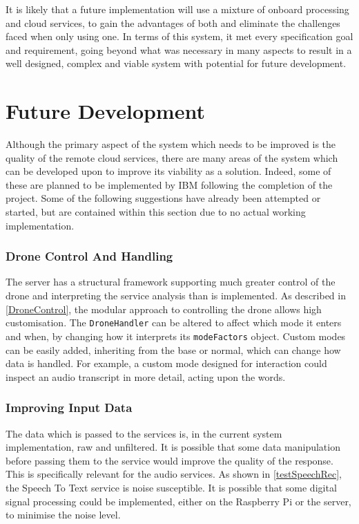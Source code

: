 \documentclass{article}
\begin{document}
It is likely that a future implementation will use a mixture of onboard processing and cloud services, to gain the advantages of both and eliminate the challenges faced when only using one. In terms of this system, it met every specification goal and requirement, going beyond what was necessary in many aspects to result in a well designed, complex and viable system with potential for future development.

\section{Future Development}
Although the primary aspect of the system which needs to be improved is the quality of the remote cloud services, there are many areas of the system which can be developed upon to improve its viability as a solution. Indeed, some of these are planned to be implemented by IBM following the completion of the project. Some of the following suggestions have already been attempted or started, but are contained within this section due to no actual working implementation.

\subsubsection{Drone Control And Handling}
The server has a structural framework supporting much greater control of the drone and interpreting the service analysis than is implemented. As described in \ref{DroneControl}, the modular approach to controlling the drone allows high customisation. The \texttt{DroneHandler} can be altered to affect which mode it enters and when, by changing how it interprets its \texttt{modeFactors} object. Custom modes can be easily added, inheriting from the base or normal, which can change how data is handled. For example, a custom mode designed for interaction could inspect an audio transcript in more detail, acting upon the words. 

\subsubsection{Improving Input Data}
The data which is passed to the services is, in the current system implementation, raw and unfiltered. It is possible that some data manipulation before passing them to the service would improve the quality of the response. This is specifically relevant for the audio services. As shown in \ref{testSpeechRec}, the Speech To Text service is noise susceptible. It is possible that some digital signal processing could be implemented, either on the Raspberry Pi or the server, to minimise the noise level.
\end{document}
